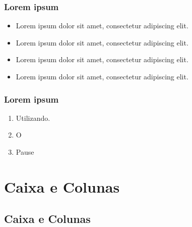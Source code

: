 \documentclass[11pt, red]{beamer}
\begin{document}
\begin{frame} \frametitle{Lorem ipsum}

\begin{itemize}
\item Lorem ipsum dolor sit amet, consectetur adipiscing elit.
\item Lorem ipsum dolor sit amet, consectetur adipiscing elit.
\item Lorem ipsum dolor sit amet, consectetur adipiscing elit.
\item Lorem ipsum dolor sit amet, consectetur adipiscing elit.
\end{itemize}

\end{frame}

\begin{frame} \frametitle{Lorem ipsum}

\begin{enumerate}
\item Utilizando.
\pause
\item O
\pause
\item Pause
\end{enumerate}

\end{frame}

\section[Caixa e Colunas]{Caixa e Colunas}

\subsection[Caixa e Colunas]{Caixa e Colunas}
\end{document}
